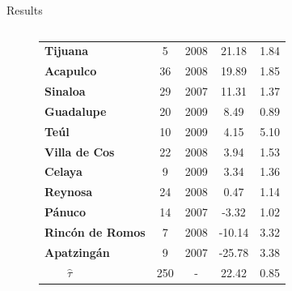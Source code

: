 \documentclass[final]{beamer}
\newlength{\sepwid}
\newlength{\onecolwid}
\newlength{\twocolwid}
\begin{document}
\begin{frame}[t]
\begin{columns}[t]
\begin{column}{\twocolwid}
\begin{block}{Results}
\begin{columns}[t,totalwidth=\twocolwid]
\begin{column}{\onecolwid}
\begin{figure}[htdp]
{\begin{minipage}[ht]{0.58\linewidth}
{\begin{tabular}{lcccc}
					  \textbf{Tijuana} &   5 & 2008 & 21.18 & 1.84 \\ %
					  \textbf{Acapulco}   &  36 & 2008 & 19.89 & 1.85 \\ %
					\textbf{Sinaloa}  &  29 & 2007 & 11.31 & 1.37 \\ %
					  \textbf{Guadalupe}  &  20 & 2009 & 8.49 & 0.89 \\ %
					   \textbf{Te\'{u}l}&  10 & 2009 & 4.15 & 5.10 \\ %
					 \textbf{Villa de Cos}  &  22 & 2008 & 3.94 & 1.53 \\ %
					    \textbf{Celaya} &   9 & 2009 & 3.34 & 1.36 \\ %
					   \textbf{Reynosa}  &  24 & 2008 & 0.47 & 1.14 \\ %
					   \textbf{P\'{a}nuco}  &  14 & 2007 & -3.32 & 1.02 \\ %
					   \textbf{Rinc\'{o}n de Romos}  &   7 & 2008 & -10.14 & 3.32 \\ %
					   \textbf{Apatzing\'{a}n}  &   9 & 2007 & -25.78 & 3.38 \\%
					\hline
					\hline 
					  $\quad \quad \hat{\tau}$  & 250 & - & 22.42 & 0.85 \\ 
					   \hline
					\end{tabular}}
	              \end{minipage}\hfill
	            }
	            \end{figure}
	          \end{column}
	        \end{columns}
	      \end{block}
    \end{column}


    \begin{column}{\sepwid}\end{column}	



\end{columns}
\end{frame}
\end{document}
